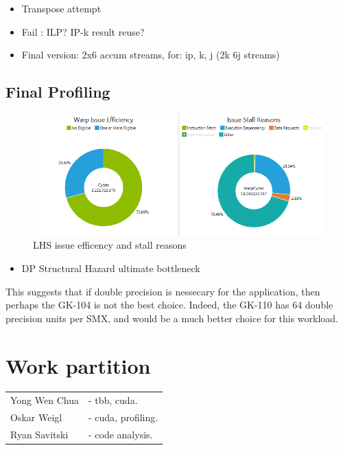 \documentclass[11pt, oneside, a4paper]{article}
\begin{document}
\begin{itemize}
	\item Transpose attempt
	\item Fail : ILP? IP-k result reuse?
	\item Final version: 2x6 accum streams, for: ip, k, j (2k 6j streams)
\end{itemize}


\subsection{Final Profiling} %
\label{sub:final_profiling}

\begin{figure}[tb]
	\begin{center}
		\includegraphics[width=\textwidth]{"LHS efficency and stall reason"}
	\end{center}
	\caption{LHS issue efficency and stall reasons}
	\label{fig:issue_eff_and_stall_reasons}
\end{figure}

\begin{itemize}
	\item DP Structural Hazard ultimate bottleneck
\end{itemize}

This suggests that if double precision is nessecary for the application, then perhaps the GK-104 is not the best choice. Indeed, the GK-110 has 64 double precision units per SMX, and would be a much better choice for this workload.




\section{Work partition} %
\label{sec:work_partition}
\begin{tabular}{ l l  }
Yong Wen Chua & - tbb, cuda. \\
Oskar Weigl & - cuda, profiling. \\
Ryan Savitski & - code analysis. \\
\end{tabular}
\end{document}
